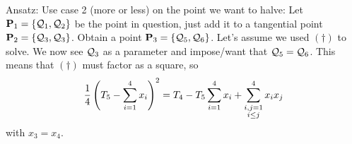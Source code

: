\documentclass[english,11pt,a4paper]{article}
\begin{document}
Ansatz: Use case 2 (more or less) on the point we want to halve: Let $\mathbf{P}_1 = \{\mathcal{Q}_1 , \mathcal{Q}_2\}$ be the point in question, just add it to a tangential point $\mathbf{P}_2 = \{\mathcal{Q}_3 , \mathcal{Q}_3\}$. Obtain a point $\mathbf{P}_3 = \{ \mathcal{Q}_5 , \mathcal{Q}_6 \}$. Let's assume we used $(\dagger)$ to solve. We now see $\mathcal{Q}_3$ as a parameter and impose/want that $\mathcal{Q}_5 = \mathcal{Q}_6$. This means that $(\dagger)$ must factor as a square, so
\begin{align*}
  \frac 1 4 \left( T_5 - \sum_{i=1}^4 x_i \right)^2 = T_4 - T_5 \sum_{i=1}^4 x_i + \sum_{\substack{i,j=1\\i\leq j}}^4 x_i x_j
\end{align*}
with $x_3 = x_4$.
\end{document}
